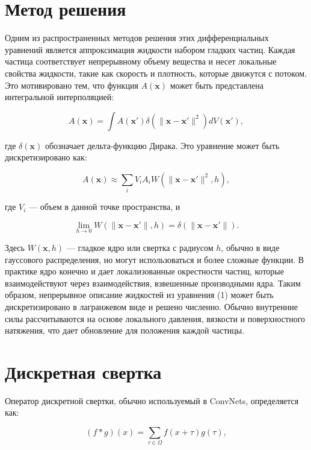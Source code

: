 \documentclass[a4paper,12pt]{article}
\theoremstyle{plain} %
\theoremstyle{definition} %
\theoremstyle{remark} %
\begin{document}
\section{Метод решения}
Одним из распространенных методов решения этих дифференциальных уравнений является аппроксимация жидкости набором гладких частиц. Каждая частица соответствует непрерывному объему вещества и несет локальные свойства жидкости, такие как скорость и плотность, которые движутся с потоком. Это мотивировано тем, что функция $A(\mathbf{x})$ может быть представлена интегральной интерполяцией:

\begin{equation}
A(\mathbf{x}) = \int A(\mathbf{x}') \delta(\|\mathbf{x} - \mathbf{x}'\|^2) dV(\mathbf{x}'),
\end{equation}

где $\delta(\mathbf{x})$ обозначает дельта-функцию Дирака. Это уравнение может быть дискретизировано как:

\begin{equation}
A(\mathbf{x}) \approx \sum_i V_i A_i W(\|\mathbf{x} - \mathbf{x}'\|^2, h),
\end{equation}

где $V_i$ — объем в данной точке пространства, и

\begin{equation}
\lim_{h \to 0} W(\|\mathbf{x} - \mathbf{x}'\|, h) = \delta(\|\mathbf{x} - \mathbf{x}'\|).
\end{equation}

Здесь $W(\mathbf{x}, h)$ — гладкое ядро или свертка с радиусом $h$, обычно в виде гауссового распределения, но могут использоваться и более сложные функции. В практике ядро конечно и дает локализованные окрестности частиц, которые взаимодействуют через взаимодействия, взвешенные производными ядра. Таким образом, непрерывное описание жидкостей из уравнения (1) может быть дискретизировано в лагранжевом виде и решено численно. Обычно внутренние силы рассчитываются на основе локального давления, вязкости и поверхностного натяжения, что дает обновление для положения каждой частицы.
\section{Дискретная свертка}
Оператор дискретной свертки, обычно используемый в ConvNets, определяется как:

\begin{equation}
(f * g)(x) = \sum_{\tau \in \Omega} f(x + \tau) g(\tau),
\end{equation}
\end{document}
